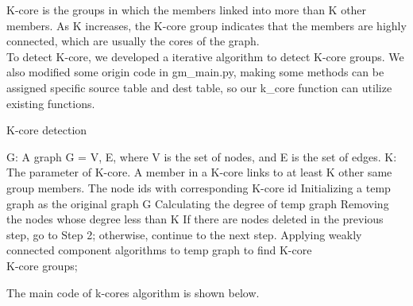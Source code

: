 
K-core is the groups in which the members linked into more than K other members. As K increases, the K-core group indicates that the members are highly connected, which are usually the cores of the graph. 
\\
To detect K-core, we developed a iterative algorithm to detect K-core groups. We also modified some origin code in gm\_main.py, making some methods can be assigned specific source table and dest table, so our k\_core function can utilize existing functions. 

\begin{algorithm}[htb]
  \caption{ K-core detection}
  \label{alg:Framwork}
  \begin{algorithmic}[1]
    \Require G: A graph G = {V, E}, where V is the set of nodes, and E is the set of edges. K: The parameter of K-core. A member in a K-core links to at least K other same group members. 
    \Ensure The node ids with corresponding K-core id
    \State Initializing a temp graph as the original graph G
    \State Calculating the degree of temp graph 
    \State Removing the nodes whose degree less than K
    \State If there are nodes deleted in the previous step, go to Step 2; otherwise, continue to the next step.
    \State Applying weakly connected component algorithms to temp graph to find K-core
    \\
    \Return K-core groups;
  \end{algorithmic}
\end{algorithm}

\clearpage

The main code of k-cores algorithm is shown below.

